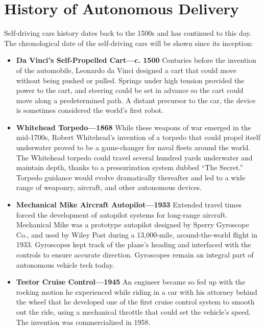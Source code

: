 \section{History of Autonomous Delivery}
\hspace{2cm} Self-driving cars history dates back to the 1500s and has continued to this day. The chronological date of the self-driving cars will be shown since its inception:
\par
\begin{itemize}
\item \textbf{Da Vinci’s Self-Propelled Cart—c. 1500} Centuries before the invention of the automobile, Leonardo da Vinci designed a cart that could move without being pushed or pulled. Springs under high tension provided the power to the cart, and steering could be set in advance so the cart could move along a predetermined path. A distant precursor to the car, the device is sometimes considered the world’s first robot.

\par
\item \textbf{Whitehead Torpedo—1868} While these weapons of war emerged in the mid-1700s, Robert Whitehead’s invention of a torpedo that could propel itself underwater proved to be a game-changer for naval fleets around the world. The Whitehead torpedo could travel several hundred yards underwater and maintain depth, thanks to a pressurization system dubbed “The Secret.” Torpedo guidance would evolve dramatically thereafter and led to a wide range of weaponry, aircraft, and other autonomous devices.

\par
\item \textbf{Mechanical Mike Aircraft Autopilot—1933 } Extended travel times forced the development of autopilot systems for long-range aircraft. Mechanical Mike was a prototype autopilot designed by Sperry Gyroscope Co., and used by Wiley Post during a 13,000-mile, around-the-world flight in 1933. Gyroscopes kept track of the plane’s heading and interfaced with the controls to ensure accurate direction. Gyroscopes remain an integral part of autonomous vehicle tech today.

\par
\item \textbf{Teetor Cruise Control—1945} An engineer became so fed up with the rocking motion he experienced while riding in a car with his attorney behind the wheel that he developed one of the first cruise control system to smooth out the ride, using a mechanical throttle that could set the vehicle’s speed. The invention was commercialized in 1958.


\end{itemize}
